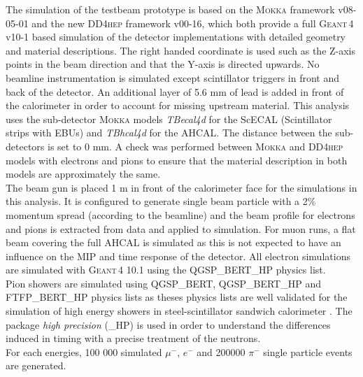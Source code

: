 \documentclass[twoside,a4paper,11pt]{article}
\newcommand\geant{\textsc{Geant\,4}\xspace}
\newcommand\mokka{\textsc{Mokka}\xspace}
\newcommand\ddhep{\textsc{DD4hep}\xspace}
\begin{document}
The simulation of the testbeam prototype is based on the \mokka framework v08-05-01 and the new \ddhep framework v00-16, which both provide a full \geant v10-1 based simulation of the detector implementations with detailed geometry and material descriptions. The right handed coordinate is used such as the Z-axis points in the beam direction and that the Y-axis is directed upwards. No beamline instrumentation is simulated except scintillator triggers in front and back of the detector. An additional layer of 5.6 mm of lead is added in front of the calorimeter in order to account for missing upstream material. This analysis uses the sub-detector \mokka models \textit{TBecal4d} for the ScECAL (Scintillator strips with EBUs) and \textit{TBhcal4d} for the AHCAL. The distance between the sub-detectors is set to 0 mm. A check was performed between \mokka and \ddhep models with electrons and pions to ensure that the material description in both models are approximately the same.\\
The beam gun is placed 1 m in front of the calorimeter face for the simulations in this analysis. It is configured to generate single beam particle with a 2\% momentum spread (according to the beamline) and the beam profile for electrons and pions is extracted from data and applied to simulation. For muon runs, a flat beam covering the full AHCAL is simulated as this is not expected to have an influence on the MIP and time response of the detector.
All electron simulations are simulated with \geant 10.1 using the QGSP\_BERT\_HP physics list.\\
Pion showers are simulated using QGSP\_BERT, QGSP\_BERT\_HP and FTFP\_BERT\_HP physics lists as theses physics lists are well validated for the simulation of high energy showers in steel-scintillator sandwich calorimeter \cite{AHCAL_Physics}. The package \textit{high precision} (\_HP) is used in order to understand the differences induced in timing with a precise treatment of the neutrons.\\
For each energies, 100 000 simulated $\mu^-$, $e^-$ and 200000 $\pi^-$ single particle events are generated.\\
\end{document}
